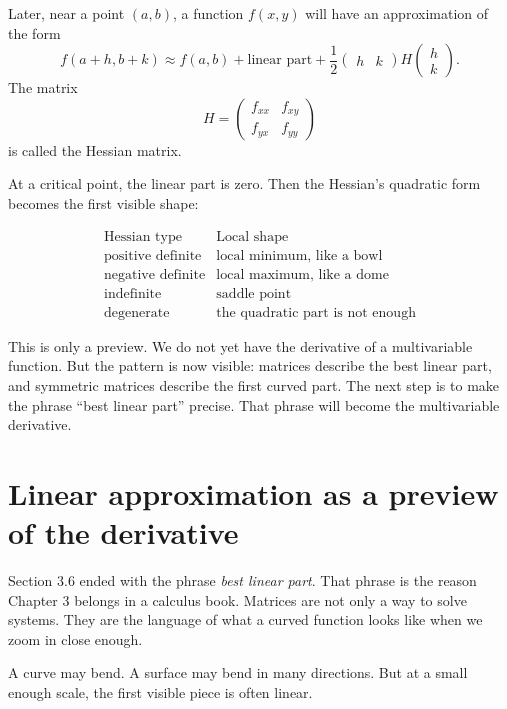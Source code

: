 Later, near a point \((a,b)\), a function \(f(x,y)\) will have an approximation of the
form
\[
    f(a+h,b+k)
    \approx
    f(a,b)
    +
    \text{linear part}
    +
    \frac12
    \begin{pmatrix}h&k\end{pmatrix}
    H
    \begin{pmatrix}
        h\\k
    \end{pmatrix}.
\]
The matrix
\[
    H=
    \begin{pmatrix}
        f_{xx}&f_{xy}\\
        f_{yx}&f_{yy}
    \end{pmatrix}
\]
is called the Hessian matrix.

At a critical point, the linear part is zero.  Then the Hessian's quadratic form becomes
the first visible shape:

\[
\begin{array}{c|c}
\text{Hessian type} & \text{Local shape} \\ \hline
\text{positive definite} & \text{local minimum, like a bowl}\\
\text{negative definite} & \text{local maximum, like a dome}\\
\text{indefinite} & \text{saddle point}\\
\text{degenerate} & \text{the quadratic part is not enough}
\end{array}
\]

This is only a preview.  We do not yet have the derivative of a multivariable function.
But the pattern is now visible: matrices describe the best linear part, and symmetric
matrices describe the first curved part.  The next step is to make the phrase
``best linear part'' precise.  That phrase will become the multivariable derivative.
\section{Linear approximation as a preview of the derivative}
\label{sec:3.7}

Section 3.6 ended with the phrase \emph{best linear part}.  That phrase is the reason
Chapter 3 belongs in a calculus book.  Matrices are not only a way to solve systems.
They are the language of what a curved function looks like when we zoom in close
enough.

A curve may bend.  A surface may bend in many directions.  But at a small enough
scale, the first visible piece is often linear.

